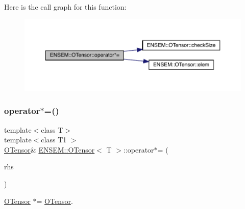 Here is the call graph for this function\+:
\nopagebreak
\begin{figure}[H]
\begin{center}
\leavevmode
\includegraphics[width=350pt]{da/d8a/classENSEM_1_1OTensor_a6edba72b265fa3629417ad85c9ae1477_cgraph}
\end{center}
\end{figure}
\mbox{\label{classENSEM_1_1OTensor_a6edba72b265fa3629417ad85c9ae1477}} 
\subsubsection{\texorpdfstring{operator$\ast$=()}{operator*=()}\hspace{0.1cm}{\footnotesize\ttfamily [6/6]}}
{\footnotesize\ttfamily template$<$class T$>$ \\
template$<$class T1 $>$ \\
\mbox{\hyperlink{classENSEM_1_1OTensor}{O\+Tensor}}\& \mbox{\hyperlink{classENSEM_1_1OTensor}{E\+N\+S\+E\+M\+::\+O\+Tensor}}$<$ T $>$\+::operator$\ast$= (\begin{DoxyParamCaption}\item[{const \mbox{\hyperlink{classENSEM_1_1OTensor}{O\+Tensor}}$<$ T1 $>$ \&}]{rhs }\end{DoxyParamCaption})\hspace{0.3cm}{\ttfamily [inline]}}



\mbox{\hyperlink{classENSEM_1_1OTensor}{O\+Tensor}} $\ast$= \mbox{\hyperlink{classENSEM_1_1OTensor}{O\+Tensor}}. 

